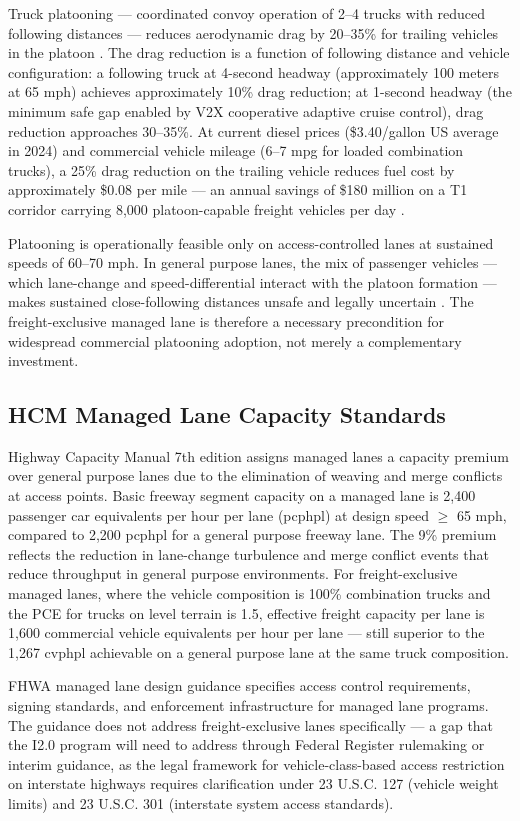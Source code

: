 Truck platooning --- coordinated convoy operation of 2--4 trucks with reduced following distances --- reduces aerodynamic drag by 20--35\% for trailing vehicles in the platoon \citep{Browand2004}. The drag reduction is a function of following distance and vehicle configuration: a following truck at 4-second headway (approximately 100 meters at 65 mph) achieves approximately 10\% drag reduction; at 1-second headway (the minimum safe gap enabled by V2X cooperative adaptive cruise control), drag reduction approaches 30--35\%. At current diesel prices (\$3.40/gallon US average in 2024) and commercial vehicle mileage (6--7 mpg for loaded combination trucks), a 25\% drag reduction on the trailing vehicle reduces fuel cost by approximately \$0.08 per mile --- an annual savings of \$180 million on a T1 corridor carrying 8,000 platoon-capable freight vehicles per day \citep{ATRI_costs2024}.

Platooning is operationally feasible only on access-controlled lanes at sustained speeds of 60--70 mph. In general purpose lanes, the mix of passenger vehicles --- which lane-change and speed-differential interact with the platoon formation --- makes sustained close-following distances unsafe and legally uncertain \citep{Browand2004}. The freight-exclusive managed lane is therefore a necessary precondition for widespread commercial platooning adoption, not merely a complementary investment.

\subsection{HCM Managed Lane Capacity Standards}

Highway Capacity Manual 7th edition \citep{HCM7} assigns managed lanes a capacity premium over general purpose lanes due to the elimination of weaving and merge conflicts at access points. Basic freeway segment capacity on a managed lane is 2,400 passenger car equivalents per hour per lane (pcphpl) at design speed $\geq$ 65 mph, compared to 2,200 pcphpl for a general purpose freeway lane. The 9\% premium reflects the reduction in lane-change turbulence and merge conflict events that reduce throughput in general purpose environments. For freight-exclusive managed lanes, where the vehicle composition is 100\% combination trucks and the PCE for trucks on level terrain is 1.5, effective freight capacity per lane is 1,600 commercial vehicle equivalents per hour per lane --- still superior to the 1,267 cvphpl achievable on a general purpose lane at the same truck composition.

FHWA managed lane design guidance \citep{FHWA_ML2021} specifies access control requirements, signing standards, and enforcement infrastructure for managed lane programs. The guidance does not address freight-exclusive lanes specifically --- a gap that the I2.0 program will need to address through Federal Register rulemaking or interim guidance, as the legal framework for vehicle-class-based access restriction on interstate highways requires clarification under 23 U.S.C. 127 (vehicle weight limits) and 23 U.S.C. 301 (interstate system access standards).
